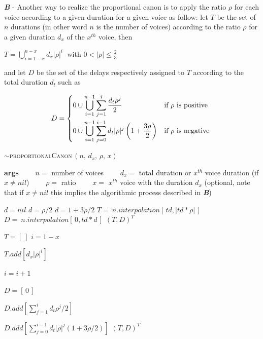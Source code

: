 \textbf{\textit{B}} - Another way to realize the proportional canon is to apply the ratio $\rho$ for each voice according to a given duration for a given voice as follow: let $T$ be the set of $n$ durations (in other word $n$ is the number of voices) according to the ratio $\rho$ for a given duration $d_x$ of the $x^{th}$ voice, then

$T= \displaystyle \bigcup\limits_{i=1-x}^{n-x} d_x |\rho|^i\;$ with $0 < | \rho | \leqslant \frac{2}{3}$

\noindent and let $D$ be the set of the delays respectively assigned to $T$ according to the total duration $d_t$ such as

\[
     D =
\begin{dcases}
    0 \cup \displaystyle \bigcup\limits_{i=1}^{n-1} \sum\limits_{j=1}^i \frac{d_t \rho^j}{2} & \text{if }  \rho \text{ is positive }\\
    0 \cup \displaystyle \bigcup\limits_{i=1}^{n-1} \sum\limits_{j=0}^{i-1} d_t |\rho|^j \left ( 1+ \frac{3\rho}{2} \right )  & \text{if }  \rho \text{ is negative }
   \end{dcases}
\]

\begin{algorithm}[H]
\caption{$\sim$\textsc{proportionalCanon}$\,(n,\, d_x,\, \rho,\, x)$}\label{ldwd}
\begin{algorithmic}%
\State \textbf{args}
\State $\qquad n =$ number of voices
\State $\qquad d_x =$ total duration or $x^{th}$ voice duration (if $x \neq nil$)
\State $\qquad \rho =$ ratio 
\State $\qquad x =$  $x^{th}$ voice with the duration $d_x$ (optional, note that if $x \neq nil$ this implies the algorithmic process described in \textbf{\textit{B}})
\State

\State
{}

\State $d=nil$
\State $d=\rho /2$
\Else
\State $d=1+3 \rho /2$
\EndIf
\State $T =\:  n.interpolation[\,td, | td*\rho |\,]$
\State $D = \: n.interpolation[\,0, td*d\,]$
\State
\Return $(T, D)^T$
\State

\Else
{}

\State $T=[\:]$
\State $i =1-x$

\State $T.add\left [d_x |\rho| ^i\right ]$

\State $i=i+1$
\EndWhile

\State
\State $D=[\,0\,]$

\State $D.add\left [ \sum_{j=1}^{i} d_t \rho^j /2 \right ]$
\Else

\State $D.add\left [ \sum_{j=0}^{i-1} d_t |\rho|^j \left (1+3\rho/2 \right ) \right ]$
\EndIf
\EndFor
\State
\Return $(T,D)^T$
\EndIf

\end{algorithmic}
\end{algorithm}

